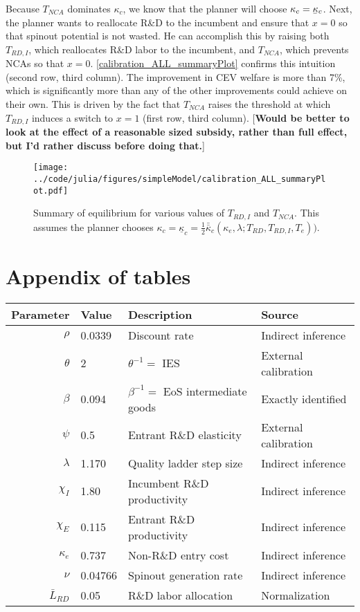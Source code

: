 \documentclass[11pt,english]{article}
\newcommand\munderbar[1]{%
	\underaccent{\bar}{#1}}
\theoremstyle{remark}
\begin{document}
Because $T_{NCA}$ dominates $\kappa_c$, we know that the planner will choose $\kappa_c = \munderbar{\kappa}_c$. Next, the planner wants to reallocate R\&D to the incumbent and ensure that $x = 0$ so that spinout potential is not wasted. He can accomplish this by raising both $T_{RD,I}$, which reallocates R\&D labor to the incumbent, and $T_{NCA}$, which prevents NCAs so that $x = 0$. \autoref{calibration_ALL_summaryPlot} confirms this intuition (second row, third column). The improvement in CEV welfare is more than 7\%, which is significantly more than any of the other improvements could achieve on their own. This is driven by the fact that $T_{NCA}$ raises the threshold at which $T_{RD,I}$ induces a switch to $x = 1$ (first row, third column). [\textbf{Would be better to look at the effect of a reasonable sized subsidy, rather than full effect, but I'd rather discuss before doing that.}] 

\begin{figure}[]
	\texttt{[image: ../code/julia/figures/simpleModel/calibration\_ALL\_summaryPlot.pdf]}
	\caption{Summary of equilibrium for various values of $T_{RD,I}$ and $T_{NCA}$. This assumes the planner chooses $\kappa_c = \underline{\kappa}_c = \frac{1}{2} \bar{\bar{\kappa}}_c(\kappa_e,\lambda;T_{RD},T_{RD,I},T_e))$.}
	\label{calibration_ALL_summaryPlot}
\end{figure}




\appendix

\section{Appendix of tables}

\begin{table}[!htb]
	\centering
	\label{calibration_2_parameters}
	\begin{tabular}{rlll}
		\toprule \toprule
		Parameter & Value & Description & Source \tabularnewline
		\midrule
		$\rho$ & 0.0339 & Discount rate  & Indirect inference \tabularnewline
		$\theta$ & 2 & $\theta^{-1} = $ IES & External calibration 
		\tabularnewline
		$\beta$ & 0.094 & $\beta^{-1} = $ EoS intermediate goods & Exactly identified \tabularnewline 
		$\psi$ & 0.5 & Entrant R\&D elasticity & External calibration \tabularnewline
		$\lambda$ & 1.170 & Quality ladder step size & Indirect inference 
		\tabularnewline
		$\chi_I$ & 1.80 & Incumbent R\&D productivity & Indirect inference 
		\tabularnewline
		$\chi_E$ & 0.115 & Entrant R\&D productivity & Indirect inference \tabularnewline 
		$\kappa_e$ & 0.737 & Non-R\&D entry cost & Indirect inference \tabularnewline
		$\nu$ & 0.04766 & Spinout generation rate  & Indirect inference\tabularnewline
		$\bar{L}_{RD}$ & 0.05 & R\&D labor allocation  & Normalization \tabularnewline
		\bottomrule
	\end{tabular}
\end{table}
\end{document}

